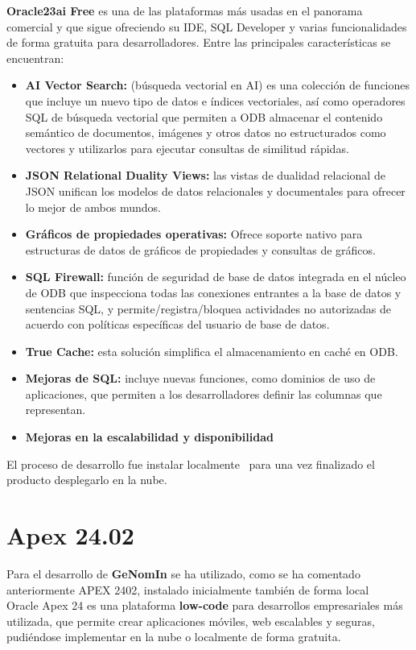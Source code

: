 \textbf{Oracle23ai Free} es una de las plataformas más usadas en el panorama comercial y que sigue ofreciendo su \acrshort{IDE}, SQL Developer y varias funcionalidades de forma gratuita para desarrolladores.
Entre las principales características se encuentran:
\begin{itemize}
	\item \textbf{AI Vector Search:} (búsqueda vectorial en AI) es una colección de funciones que incluye un nuevo tipo de datos e índices vectoriales, así como  operadores SQL de búsqueda vectorial que permiten a \acrfull{ODB} almacenar el contenido semántico de documentos, imágenes y otros datos no estructurados como vectores y utilizarlos para ejecutar consultas de similitud rápidas.
	\item \textbf{JSON Relational Duality Views:} las vistas de dualidad relacional de JSON unifican los modelos de datos relacionales y documentales para ofrecer lo mejor de ambos mundos.
	\item \textbf{Gráficos de propiedades operativas:} Ofrece soporte nativo para estructuras de datos de gráficos de propiedades y consultas de gráficos.
	\item \textbf{SQL Firewall:} función de seguridad de base de datos integrada en el núcleo de \acrfull{ODB} que inspecciona todas las conexiones entrantes a la base de datos y sentencias SQL, y permite/registra/bloquea actividades no autorizadas de acuerdo con políticas específicas del usuario de base de datos.
	\item \textbf{True Cache:} esta solución simplifica el almacenamiento en caché en \acrfull{ODB}.
	\item \textbf{Mejoras de SQL:} incluye nuevas funciones, como dominios de uso de aplicaciones, que permiten a los desarrolladores definir las columnas que representan.
	\item \textbf{Mejoras en la escalabilidad y disponibilidad}
\end{itemize}

El proceso de desarrollo fue instalar localmente~\cite{DattaInstallingOracleDatabasea} para una vez finalizado el producto desplegarlo en la nube.

\section{Apex 24.02} \label{sec: apex}
Para el desarrollo de \textbf{GeNomIn} se ha utilizado, como se ha comentado anteriormente \acrshort{APEX} 2402, instalado inicialmente también de forma local ~\cite{JenningsInstallingConfiguringAPEX}
Oracle Apex 24 es una plataforma \textbf{low-code} para desarrollos empresariales más utilizada, que permite crear aplicaciones móviles, web escalables y seguras, pudiéndose implementar en la nube o localmente de forma gratuita.

